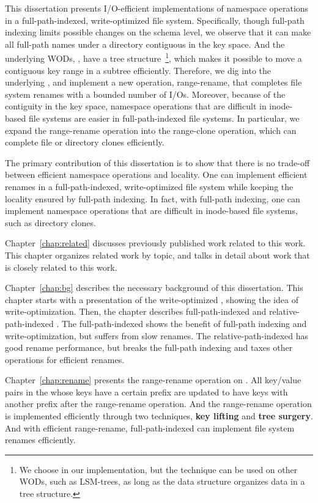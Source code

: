 This dissertation presents I/O-efficient implementations of namespace operations
in a full-path-indexed, write-optimized file system.
Specifically, though full-path indexing limits possible changes on the schema
level, we observe that it can make all full-path names under a directory
contiguous in the key space.
And the underlying WODs, \bets, have a tree structure~\footnote{
We choose \bets in our implementation, but the technique can be used on other
WODs, such as LSM-trees, as long as the data structure organizes data in a
tree structure.},
which makes it possible to move a contiguous key range in a subtree efficiently.
Therefore, we dig into the underlying \bets, and implement a new operation,
range-rename, that completes file system renames with a bounded number of I/Os.
Moreover, because of the contiguity in the key space,
namespace operations that are difficult in inode-based file systems are easier
in full-path-indexed file systems.
In particular, we expand the range-rename operation into the range-clone
operation, which can complete file or directory clones efficiently.

The primary contribution of this dissertation is to show that there is no
trade-off between efficient namespace operations and locality.
One can implement efficient renames in a full-path-indexed, write-optimized
file system while keeping the locality ensured by full-path indexing.
In fact, with full-path indexing, one can implement namespace operations that
are difficult in inode-based file systems, such as directory clones.

Chapter~\ref{chap:related} discusses previously published work related to
this work.
This chapter organizes related work by topic,
and talks in detail about work that is closely related to this work.

Chapter~\ref{chap:bg} describes the necessary background of this dissertation.
This chapter starts with a presentation of the write-optimized \bets,
showing the idea of write-optimization.
Then, the chapter describes full-path-indexed \betrfs and
relative-path-indexed \betrfs.
The full-path-indexed \betrfs shows the benefit of full-path indexing and
write-optimization, but suffers from slow renames.
The relative-path-indexed \betrfs has good rename performance, but breaks the
full-path indexing and taxes other operations for efficient renames.

Chapter~\ref{chap:rename} presents the range-rename operation on \bets.
All key/value pairs in the \bet whose keys have a certain prefix are updated to
have keys with another prefix after the range-rename operation.
And the range-rename operation is implemented efficiently through two techniques,
\textbf{key lifting} and \textbf{tree surgery}.
And with efficient range-rename, full-path-indexed \betrfs can implement file
system renames efficiently.

